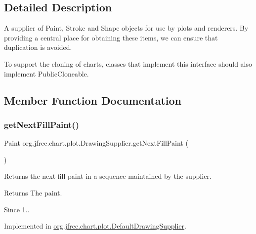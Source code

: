 \subsection{Detailed Description}
A supplier of {\ttfamily Paint}, {\ttfamily Stroke} and {\ttfamily Shape} objects for use by plots and renderers. By providing a central place for obtaining these items, we can ensure that duplication is avoided. 

To support the cloning of charts, classes that implement this interface should also implement {\ttfamily Public\+Cloneable}. 

\subsection{Member Function Documentation}
\mbox{\label{interfaceorg_1_1jfree_1_1chart_1_1plot_1_1_drawing_supplier_ad9386ba5a8bd895ba5b4850618324366}} 
\subsubsection{\texorpdfstring{get\+Next\+Fill\+Paint()}{getNextFillPaint()}}
{\footnotesize\ttfamily Paint org.\+jfree.\+chart.\+plot.\+Drawing\+Supplier.\+get\+Next\+Fill\+Paint (\begin{DoxyParamCaption}{ }\end{DoxyParamCaption})}

Returns the next fill paint in a sequence maintained by the supplier.

\begin{DoxyReturn}{Returns}
The paint.
\end{DoxyReturn}
\begin{DoxySince}{Since}
1.. 
\end{DoxySince}


Implemented in \mbox{\hyperlink{classorg_1_1jfree_1_1chart_1_1plot_1_1_default_drawing_supplier_a25a4db4213706fe8b54a0490aa14e727}{org.\+jfree.\+chart.\+plot.\+Default\+Drawing\+Supplier}}.

\mbox{\label{interfaceorg_1_1jfree_1_1chart_1_1plot_1_1_drawing_supplier_a2b467eb43237810e9ab135ecd3d70017}} 
